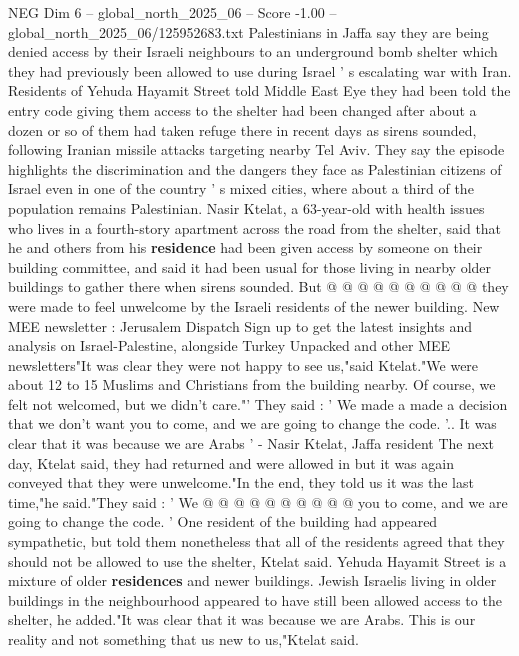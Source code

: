 \begin{textsample}{NEG Dim 6 – global\_north\_2025\_06 – Score -1.00 – global\_north\_2025\_06/125952683.txt}  \label{ex:f6_neg_431}
Palestinians in Jaffa say they are being denied access by their Israeli neighbours to an underground bomb shelter which they had previously been allowed to use during Israel ' s escalating war with Iran.
Residents of Yehuda Hayamit Street told Middle East Eye they had been told the entry code giving them access to the shelter had been changed after about a dozen or so of them had taken refuge there in recent days as sirens sounded, following Iranian missile attacks targeting nearby Tel Aviv.
They say the episode highlights the discrimination and the dangers they face as Palestinian citizens of Israel even in one of the country ' s mixed cities, where about a third of the population remains Palestinian.
Nasir Ktelat, a 63-year-old with health issues who lives in a fourth-story apartment across the road from the shelter, said that he and others from his \textbf{residence} had been given access by someone on their building committee, and said it had been usual for those living in nearby older buildings to gather there when sirens sounded.
But @ @ @ @ @ @ @ @ @ @ they were made to feel unwelcome by the Israeli residents of the newer building.
New MEE newsletter : Jerusalem Dispatch Sign up to get the latest insights and analysis on Israel-Palestine, alongside Turkey Unpacked and other MEE newsletters"It was clear they were not happy to see us,"said Ktelat."We were about 12 to 15 Muslims and Christians from the building nearby.
Of course, we felt not welcomed, but we didn't care."' They said : ' We made a made a decision that we don't want you to come, and we are going to change the code. '..
It was clear that it was because we are Arabs ' - Nasir Ktelat, Jaffa resident The next day, Ktelat said, they had returned and were allowed in but it was again conveyed that they were unwelcome."In the end, they told us it was the last time,"he said."They said : ' We @ @ @ @ @ @ @ @ @ @ you to come, and we are going to change the code. ' One resident of the building had appeared sympathetic, but told them nonetheless that all of the residents agreed that they should not be allowed to use the shelter, Ktelat said.
Yehuda Hayamit Street is a mixture of older \textbf{residences} and newer buildings.
Jewish Israelis living in older buildings in the neighbourhood appeared to have still been allowed access to the shelter, he added."It was clear that it was because we are Arabs.
This is our reality and not something that us new to us,"Ktelat said.

\end{textsample}
